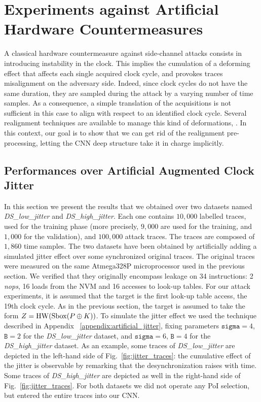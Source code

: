 

\section{Experiments against Artificial Hardware Countermeasures}\label{sec:hard}

A classical hardware countermeasure against side-channel attacks consists in introducing instability in the clock. This implies the cumulation of a deforming effect that affects each single acquired clock cycle, and provokes traces misalignment on the adversary side. Indeed, since clock cycles do not have the same duration, they are sampled during the attack by a varying number of time samples. As a consequence, a simple translation of the acquisitions is not sufficient in this case to align with respect to an identified clock cycle. Several realignment techniques are available to manage this kind of deformations, \eg \cite{van2011improving}. In this context, our goal is to show that  we can get rid of the realignment pre-processing, letting the CNN deep structure take it in charge implicitly. 

\subsection{Performances over Artificial Augmented Clock Jitter}\label{sec:artificial}
In this section we present the results that we obtained over two datasets named \emph{DS\_low\_jitter} and \emph{DS\_high\_jitter}. Each one contains $10,000$ labelled traces, used for the training phase (more precisely, $9,000$ are used for the training, and $1,000$ for the validation), and $100,000$ attack traces. The traces are composed of $1,860$ time samples. The two datasets have been obtained by artificially adding a simulated jitter effect over some synchronized original traces. The original traces were measured on the same Atmega328P microprocessor used in the previous section. We verified that they originally encompass leakage on 34 instructions: 2 \emph{nops}, 16 loads from the NVM and 16 accesses to look-up tables. For our attack experiments, it is assumed that the target is the first look-up table access, \ie the 19th clock cycle. As in the previous section, the target is assumed to take the form $Z=\mathrm{HW}(\mathrm{Sbox}(P\oplus K))$. To simulate the jitter effect we used the technique described in Appendix~	\ref{appendix:artificial_jitter}, fixing parameters $\texttt{sigma}=4$, $\texttt{B}=2$ for the \emph{DS\_low\_jitter} dataset,  and $\texttt{sigma}=6$, $\texttt{B}=4$ for the \emph{DS\_high\_jitter} dataset. As an example, some traces of  \emph{DS\_low\_jitter} are depicted in the left-hand side of Fig.~\ref{fig:jitter_traces}: the cumulative effect of the jitter is observable by remarking that the desynchronization raises with time. Some traces of \emph{DS\_high\_jitter} are depicted as well in the right-hand side of Fig.~\ref{fig:jitter_traces}. For both datasets we did not operate any PoI selection, but entered the entire traces into our CNN.


